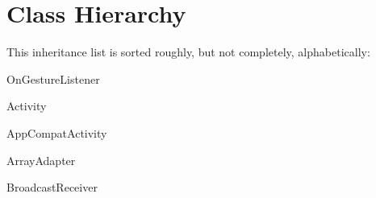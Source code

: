 \section{Class Hierarchy}
This inheritance list is sorted roughly, but not completely, alphabetically\+:\begin{DoxyCompactList}
\item {}
\item {}
\item {}
\begin{DoxyCompactList}
\item {}
\end{DoxyCompactList}
\item On\+Gesture\+Listener\begin{DoxyCompactList}
\item {}
\end{DoxyCompactList}
\item {}
\item {}
\item Activity\begin{DoxyCompactList}
\item {}
\end{DoxyCompactList}
\item App\+Compat\+Activity\begin{DoxyCompactList}
\item {}
\item {}
\end{DoxyCompactList}
\item Array\+Adapter\begin{DoxyCompactList}
\item {}
\item {}
\end{DoxyCompactList}
\item Broadcast\+Receiver\begin{DoxyCompactList}

\end{DoxyCompactList}
\end{DoxyCompactList}
